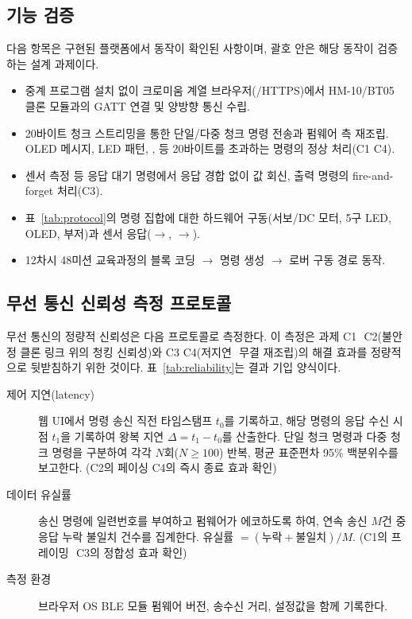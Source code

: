 \documentclass[10pt]{article}
\begin{document}
\subsection{기능 검증}
다음 항목은 구현된 플랫폼에서 동작이 확인된 사항이며, 괄호 안은 해당 동작이 검증하는
설계 과제이다.
\begin{itemize}
  \item 중계 프로그램 설치 없이 크로미움 계열 브라우저(/HTTPS)에서
        HM-10/BT05 클론 모듈과의 GATT 연결 및 양방향 통신 수립.
  \item 20바이트 청크 스트리밍을 통한 단일/다중 청크 명령 전송과 펌웨어 측 재조립.
        OLED 메시지, LED 패턴, ,  등 20바이트를 초과하는
        명령의 정상 처리(C1\,\textperiodcentered\,C4).
  \item 센서 측정 등 응답 대기 명령에서 응답 경합 없이 값 회신, 출력 명령의
        fire-and-forget 처리(C3).
  \item 표~\ref{tab:protocol}의 명령 집합에 대한 하드웨어 구동(서보/DC 모터, 5구 LED,
        OLED, 부저)과 센서 응답($\rightarrow$,
        $\rightarrow$).
  \item 12차시 48미션 교육과정의 블록 코딩 $\rightarrow$ 명령 생성 $\rightarrow$
        로버 구동 경로 동작.
\end{itemize}

\subsection{무선 통신 신뢰성 측정 프로토콜}
무선 통신의 정량적 신뢰성은 다음 프로토콜로 측정한다. 이 측정은 과제 C1\,\textperiodcentered\,
C2(불안정 클론 링크 위의 청킹 신뢰성)와 C3\,\textperiodcentered\,C4(저지연
\,\textperiodcentered\,무결 재조립)의 해결 효과를 정량적으로 뒷받침하기 위한 것이다.
표~\ref{tab:reliability}는 결과 기입 양식이다.

\begin{description}
  \item[제어 지연(latency)] 웹 UI에서 명령 송신 직전 타임스탬프 $t_0$를 기록하고,
        해당 명령의 응답 수신 시점 $t_1$을 기록하여 왕복 지연 $\Delta = t_1 - t_0$를
        산출한다. 단일 청크 명령과 다중 청크 명령을 구분하여 각각 $N$회($N \ge 100$)
        반복, 평균\,\textperiodcentered\,표준편차\,\textperiodcentered\,95\%
        백분위수를 보고한다. (C2의 페이싱\,\textperiodcentered\,C4의 즉시 종료 효과 확인)
  \item[데이터 유실률] 송신 명령에 일련번호를 부여하고 펌웨어가 에코하도록 하여,
        연속 송신 $M$건 중 응답 누락\,\textperiodcentered\,불일치 건수를 집계한다.
        유실률 $= (\text{누락}+\text{불일치}) / M$. (C1의 프레이밍\,\textperiodcentered\,
        C3의 정합성 효과 확인)
  \item[측정 환경] 브라우저\,\textperiodcentered\,OS\,\textperiodcentered\,BLE
        모듈 펌웨어 버전, 송수신 거리,  설정값을 함께 기록한다.
\end{description}
\end{document}
